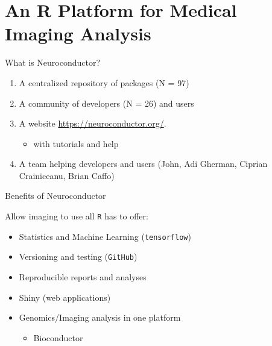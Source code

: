 \documentclass[ignorenonframetext,]{beamer}
\providecommand{\tightlist}{%
  \setlength{\itemsep}{0pt}\setlength{\parskip}{0pt}}
\begin{document}
\hypertarget{an-r-platform-for-medical-imaging-analysis}{%
\section{\texorpdfstring{ An R Platform for Medical Imaging
Analysis}{  An R Platform for   Medical Imaging Analysis}}\label{an-r-platform-for-medical-imaging-analysis}}

\begin{frame}{What is Neuroconductor?}
\protect\hypertarget{what-is-neuroconductor}{}

\begin{enumerate}
\tightlist
\item
  A centralized repository of packages (N = 97)
\item
  A community of developers (N = 26) and users
\item
  A website \url{https://neuroconductor.org/}.

  \begin{itemize}
  \tightlist
  \item
    with tutorials and help
  \end{itemize}
\item
  A team helping developers and users (John, Adi Gherman, Ciprian
  Crainiceanu, Brian Caffo)
\end{enumerate}

\end{frame}

\begin{frame}[fragile]{Benefits of Neuroconductor}
\protect\hypertarget{benefits-of-neuroconductor}{}

Allow imaging to use all \texttt{R} has to offer:

\begin{itemize}
\tightlist
\item
  Statistics and Machine Learning (\texttt{tensorflow})
\item
  Versioning and testing (\texttt{GitHub})
\item
  Reproducible reports and analyses
\item
  Shiny (web applications)
\item
  Genomics/Imaging analysis in one platform

  \begin{itemize}
  \tightlist
  \item
    Bioconductor
  \end{itemize}
\end{itemize}

\end{frame}
\end{document}
